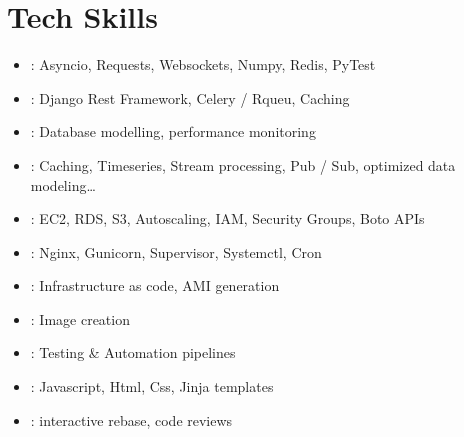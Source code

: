 \documentclass[letterpaper,10pt,english]{sphinxmanual}
\begin{document}
\chapter{Tech Skills}
\label{\detokenize{index:tech-skills}}\begin{itemize}
\item {} 
\sphinxAtStartPar
{} : Asyncio, Requests, Websockets, Numpy, Redis, PyTest

\item {} 
\sphinxAtStartPar
{} : Django Rest Framework, Celery / Rqueu, Caching

\item {} 
\sphinxAtStartPar
{} : Database modelling, performance monitoring

\item {} 
\sphinxAtStartPar
{} : Caching, Timeseries, Stream processing, Pub / Sub, optimized data modeling…

\item {} 
\sphinxAtStartPar
{} : EC2, RDS, S3, Autoscaling, IAM, Security Groups, Boto APIs

\item {} 
\sphinxAtStartPar
{} : Nginx, Gunicorn, Supervisor, Systemctl, Cron

\item {} 
\sphinxAtStartPar
{} : Infrastructure as code, AMI generation

\item {} 
\sphinxAtStartPar
{} : Image creation

\item {} 
\sphinxAtStartPar
{} : Testing \& Automation pipelines

\item {} 
\sphinxAtStartPar
{} : Javascript, Html, Css, Jinja templates

\item {} 
\sphinxAtStartPar
{} : interactive rebase, code reviews

\end{itemize}
\end{document}
